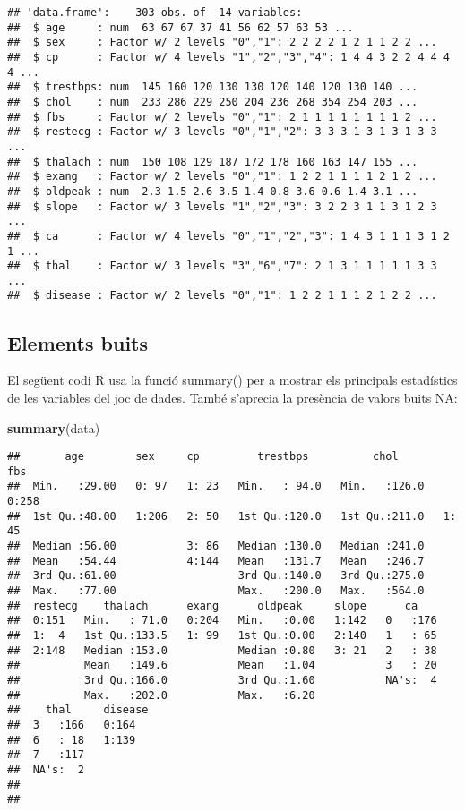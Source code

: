 \documentclass[12,]{article}
\newenvironment{Shaded}{\begin{snugshade}}{\end{snugshade}}
\newcommand{\KeywordTok}[1]{\textcolor[rgb]{0.13,0.29,0.53}{\textbf{#1}}}
\newcommand{\NormalTok}[1]{#1}
\begin{document}
\begin{verbatim}
## 'data.frame':    303 obs. of  14 variables:
##  $ age     : num  63 67 67 37 41 56 62 57 63 53 ...
##  $ sex     : Factor w/ 2 levels "0","1": 2 2 2 2 1 2 1 1 2 2 ...
##  $ cp      : Factor w/ 4 levels "1","2","3","4": 1 4 4 3 2 2 4 4 4 4 ...
##  $ trestbps: num  145 160 120 130 130 120 140 120 130 140 ...
##  $ chol    : num  233 286 229 250 204 236 268 354 254 203 ...
##  $ fbs     : Factor w/ 2 levels "0","1": 2 1 1 1 1 1 1 1 1 2 ...
##  $ restecg : Factor w/ 3 levels "0","1","2": 3 3 3 1 3 1 3 1 3 3 ...
##  $ thalach : num  150 108 129 187 172 178 160 163 147 155 ...
##  $ exang   : Factor w/ 2 levels "0","1": 1 2 2 1 1 1 1 2 1 2 ...
##  $ oldpeak : num  2.3 1.5 2.6 3.5 1.4 0.8 3.6 0.6 1.4 3.1 ...
##  $ slope   : Factor w/ 3 levels "1","2","3": 3 2 2 3 1 1 3 1 2 3 ...
##  $ ca      : Factor w/ 4 levels "0","1","2","3": 1 4 3 1 1 1 3 1 2 1 ...
##  $ thal    : Factor w/ 3 levels "3","6","7": 2 1 3 1 1 1 1 1 3 3 ...
##  $ disease : Factor w/ 2 levels "0","1": 1 2 2 1 1 1 2 1 2 2 ...
\end{verbatim}

\hypertarget{elements-buits}{%
\subsection{Elements buits}\label{elements-buits}}

El següent codi R usa la funció summary() per a mostrar els principals
estadístics de les variables del joc de dades. També s'aprecia la
presència de valors buits NA:

\begin{Shaded}
\begin{Highlighting}[]
\KeywordTok{summary}\NormalTok{(data)}
\end{Highlighting}
\end{Shaded}

\begin{verbatim}
##       age        sex     cp         trestbps          chol       fbs    
##  Min.   :29.00   0: 97   1: 23   Min.   : 94.0   Min.   :126.0   0:258  
##  1st Qu.:48.00   1:206   2: 50   1st Qu.:120.0   1st Qu.:211.0   1: 45  
##  Median :56.00           3: 86   Median :130.0   Median :241.0          
##  Mean   :54.44           4:144   Mean   :131.7   Mean   :246.7          
##  3rd Qu.:61.00                   3rd Qu.:140.0   3rd Qu.:275.0          
##  Max.   :77.00                   Max.   :200.0   Max.   :564.0          
##  restecg    thalach      exang      oldpeak     slope      ca     
##  0:151   Min.   : 71.0   0:204   Min.   :0.00   1:142   0   :176  
##  1:  4   1st Qu.:133.5   1: 99   1st Qu.:0.00   2:140   1   : 65  
##  2:148   Median :153.0           Median :0.80   3: 21   2   : 38  
##          Mean   :149.6           Mean   :1.04           3   : 20  
##          3rd Qu.:166.0           3rd Qu.:1.60           NA's:  4  
##          Max.   :202.0           Max.   :6.20                     
##    thal     disease
##  3   :166   0:164  
##  6   : 18   1:139  
##  7   :117          
##  NA's:  2          
##                    
## 
\end{verbatim}
\end{document}
